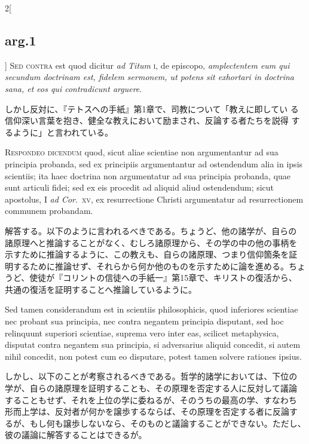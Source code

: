 \documentclass[
paper=a4paper,
fontsize=10pt,
jafontsize=9pt,
titlepage
]{jlreq}
\begin{document}
\begin{paracol}{2}[\subsection{arg.1}]
{\scshape Sed contra} est quod dicitur {\itshape ad Titum} {\scshape
i}, de episcopo, {\itshape amplectentem eum qui secundum doctrinam
est, fidelem sermonem, ut potens sit exhortari in doctrina sana, et
eos qui contradicunt arguere}.

\switchcolumn

しかし反対に、『テトスヘの手紙』第1章で、司教について「教えに即してい
る信仰深い言葉を抱き、健全な教えにおいて励まされ、反論する者たちを説得
するように」と言われている。


{\scshape Respondeo dicendum} quod, sicut aliae scientiae non
argumentantur ad sua principia probanda, sed ex principiis
argumentantur ad ostendendum alia in ipsis scientiis; ita haec
doctrina non argumentatur ad sua principia probanda, quae sunt
articuli fidei; sed ex eis procedit ad aliquid aliud ostendendum;
sicut apostolus, I {\itshape ad Cor}.~{\scshape xv}, ex resurrectione
Christi argumentatur ad resurrectionem communem probandam.

\switchcolumn

解答する。以下のように言われるべきである。ちょうど、他の諸学が、自らの
諸原理へと推論することがなく、むしろ諸原理から、その学の中の他の事柄を
示すために推論するように、この教えも、自らの諸原理、つまり信仰箇条を証
明するために推論せず、それらから何か他のものを示すために論を進める。ちょ
うど、使徒が『コリントの信徒への手紙一』第15章で、キリストの復活から、
共通の復活を証明することへ推論しているように。

\switchcolumn*

Sed tamen considerandum est in scientiis philosophicis, quod
inferiores scientiae nec probant sua principia, nec contra negantem
principia disputant, sed hoc relinquunt superiori scientiae, suprema
vero inter eas, scilicet metaphysica, disputat contra negantem sua
principia, si adversarius aliquid concedit, si autem nihil concedit,
non potest cum eo disputare, potest tamen solvere rationes ipsius.

\switchcolumn

しかし、以下のことが考察されるべきである。哲学的諸学においては、下位の
学が、自らの諸原理を証明することも、その原理を否定する人に反対して議論
することもせず、それを上位の学に委ねるが、そのうちの最高の学、すなわち
形而上学は、反対者が何かを譲歩するならば、その原理を否定する者に反論す
るが、もし何も譲歩しないなら、そのものと議論することができない。ただし、
彼の議論に解答することはできるが。


\end{paracol}
\end{document}
